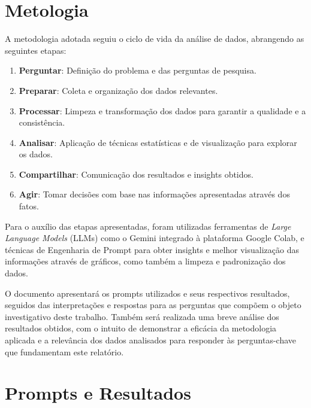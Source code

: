 \documentclass[12pt, a4paper, onecolumn]{article}
\begin{document}
    \section{Metologia}
    A metodologia adotada seguiu o ciclo de vida da análise de dados, abrangendo as seguintes etapas:
    \begin{enumerate}
        \item \textbf{Perguntar}: Definição do problema e das perguntas de pesquisa.
        \item \textbf{Preparar}: Coleta e organização dos dados relevantes.
        \item \textbf{Processar}: Limpeza e transformação dos dados para garantir a qualidade e a consistência.
        \item \textbf{Analisar}: Aplicação de técnicas estatísticas e de visualização para explorar os dados.
        \item \textbf{Compartilhar}: Comunicação dos resultados e insights obtidos.
        \item \textbf{Agir}: Tomar decisões com base nas informações apresentadas através dos fatos.
    \end{enumerate}

    Para o auxílio das etapas apresentadas, foram utilizadas ferramentas de \emph{Large Language Models} (LLMs) como o Gemini integrado à plataforma Google Colab, e técnicas de Engenharia de Prompt para obter insights e melhor visualização das informações através de gráficos, como também a limpeza e padronização dos dados.
    
    O documento apresentará os prompts utilizados e seus respectivos resultados, seguidos das interpretações e respostas para as perguntas que compõem o objeto investigativo deste trabalho. Também será realizada uma breve análise dos resultados obtidos, com o intuito de demonstrar a eficácia da metodologia aplicada e a relevância dos dados analisados para responder às perguntas-chave que fundamentam este relatório.

    \section{Prompts e Resultados}
\end{document}

